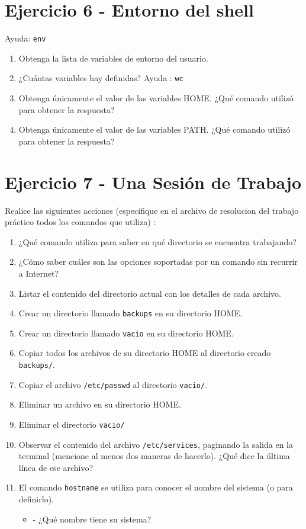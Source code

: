 \documentclass[12pt]{article}
\begin{document}
\section*{Ejercicio 6 - Entorno del shell}
Ayuda: \texttt{env}
\begin{enumerate}
\item Obtenga la lista de variables de entorno del usuario.
\item ¿Cuántas variables hay definidas? Ayuda : \texttt{wc}
\item Obtenga únicamente el valor de las variables HOME. ¿Qué comando utilizó para obtener la respuesta?
\item Obtenga únicamente el valor de las variables PATH. ¿Qué comando utilizó para obtener la respuesta?
\end{enumerate}


\section*{Ejercicio 7 - Una Sesión de Trabajo}

Realice las siguientes acciones (especifique en el archivo de resolucion del trabajo práctico todos los comandos que utiliza) : 

	\begin{enumerate}
\item ¿Qué comando utiliza para saber en qué directorio se encuentra trabajando?
\item ¿Cómo saber cuáles son las opciones soportadas por un comando sin recurrir a Internet?
	\item Listar el contenido del directorio actual con los detalles de cada archivo. 
	\item Crear un directorio llamado \texttt{backups} en su directorio HOME.
	\item Crear un directorio llamado \texttt{vacio} en su directorio HOME.
	\item Copiar todos los archivos de su directorio HOME al directorio creado \texttt{backups/}.
	\item Copiar el archivo \texttt{/etc/passwd} al directorio \texttt{vacio/}.
	\item Eliminar un archivo en su directorio HOME.
	\item Eliminar el directorio \texttt{vacio/}
	\item Observar el contenido del archivo \texttt{/etc/services}, paginando la salida en la terminal (mencione al menos dos maneras de hacerlo). ¿Qué dice la última línea de ese archivo?
\item El comando \texttt{hostname} se utiliza para conocer el nombre del sistema (o para definirlo).
\begin{itemize}
\item - ¿Qué nombre tiene su sistema?
\end{itemize}
	\end{enumerate}
 
\end{document}
